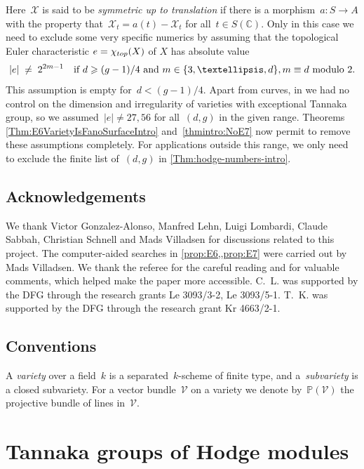 \documentclass[a4paper]{amsart}
\newcommand{\bbC}{\mathbb{C}}
\newcommand{\bbP}{\mathbb{P}}
\newcommand{\cV}{\mathcal{V}}
\newcommand{\cX}{\mathcal{X}}
\renewcommand{\top}{\textup{top}}
\renewcommand{\ge}{\geqslant}
\theoremstyle{plain}
\theoremstyle{definition}
\numberwithin{equation}{section}
\begin{document}
Here~$\cX$ is said to be \emph{symmetric up to translation} if there is a morphism~$a \colon S \to A$ with the property that~$\cX_t = a(t) - \cX_t$ for all~$t \in S(\bbC)$. Only in this case we need to exclude some very specific numerics by assuming that the topological Euler characteristic $e = \chi_{\top}(X)$ of $X$ has absolute value
 \begin{equation} \label{Eq:NumericalConditions}  
|e| \;\neq\;
2^{2m - 1} \quad \text{if~$d \ge (g-1)/4$ and $ m\in \{3, \dots, d\}, m\equiv d$ modulo $2$.}
\end{equation}
This assumption is empty for~$d < (g-1)/4$. Apart from curves, in \cite{JKLM} we had no control on the dimension and irregularity of varieties with exceptional Tannaka group, so we assumed~$|e| \neq 27, 56$ for all~$(d, g)$ in the given range.
Theorems \ref{Thm:E6VarietyIsFanoSurfaceIntro} and~\ref{thmintro:NoE7} now  permit to remove these assumptions completely. For applications outside this range, we only need to exclude the finite list of~$(d, g)$ in \cref{Thm:hodge-numbers-intro}.


\subsection*{Acknowledgements} 
We thank Victor Gonzalez-Alonso, Manfred Lehn, Luigi Lombardi,  Claude Sabbah, Christian Schnell and Mads Villadsen for discussions related to this project. The computer-aided searches in \cref{prop:E6,,prop:E7} were carried out by Mads Villadsen. We thank the referee for the careful reading and for valuable comments, which helped make the paper more accessible. C.~L. was supported by the DFG through the research grants Le 3093/3-2, Le 3093/5-1. T.~K. was supported by the DFG through the research grant Kr 4663/2-1. 

\subsection*{Conventions} A \emph{variety} over a field~$k$ is a separated~$k$-scheme of finite type, and a~\emph{subvariety} is a closed subvariety. For a vector bundle~$\cV$ on a variety we denote by~$\bbP(\cV)$ the projective bundle of lines in~$\cV$. 


\section{Tannaka groups of Hodge modules} \label{sec:HodgeModules}
\end{document}
